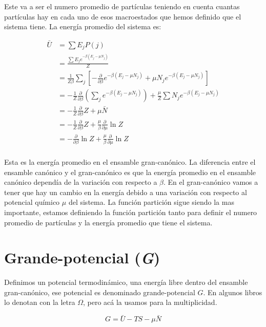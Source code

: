 \documentclass[11pt,fleqn]{book}
\begin{document}
Este va a ser el numero promedio de partículas teniendo en cuenta cuantas partículas hay en cada uno de esos macroestados que hemos definido que el sistema tiene. La energía promedio del sistema es:

\begin{equation}
    \begin{split}
        \bar{U}&=\sum E_{j}P(j)\\
        &=\frac{\sum E_{j}e^{-\beta(E_{j}-\mu N_{j})}}{Z}\\
        &=\frac{1}{Z\beta}\sum_{j}\left[-\frac{\partial}{\partial\beta}e^{-\beta(E_{j}-\mu N_{j})}+\mu N_{j}e^{-\beta(E_{j}-\mu N_{j})}\right]\\
        &=-\frac{1}{Z}\frac{\partial}{\partial\beta}\left(\sum_{j}e^{-\beta(E_{j}-\mu N_{j})}\right)+\frac{\mu}{Z}\sum N_{j}e^{-\beta(E_{j}-\mu N_{j})}\\
        &=-\frac{1}{Z}\frac{\partial}{\partial\beta}Z+\mu \bar{N}\\
        &=-\frac{1}{Z}\frac{\partial}{\partial\beta}Z+\frac{\mu}{\beta}\frac{\partial}{\partial\mu}\ln{Z}\\
        &=-\frac{\partial}{\partial\beta}\ln{Z}+\frac{\mu}{\beta}\frac{\partial}{\partial\mu}\ln{Z}\\
    \end{split}
    \label{Eq. 5.10}
\end{equation}

Esta es la energía promedio en el ensamble gran-canónico. La diferencia entre el ensamble canónico y el gran-canónico es que la energía promedio en el ensamble canónico dependía de la variación con respecto a $\beta$. En el gran-canónico vamos a tener que hay un cambio en la energía debido a una variación con respecto al potencial químico $\mu$ del sistema. La función partición sigue siendo la mas importante, estamos definiendo la función partición tanto para definir el numero promedio de partículas y la energía promedio que tiene el sistema.  

\section{Grande-potencial (\textit{G})}

Definimos un potencial termodinámico, una energía  libre dentro del ensamble gran-canónico, ese potencial es denominado grande-potencial $G$. En algunos libros lo denotan con la letra $\Omega$, pero acá la usamos para la multiplicidad.

\begin{equation}
G=\bar{U}-TS-\mu \bar{N}    
    \label{Eq. 5.11}
\end{equation}
\end{document}
